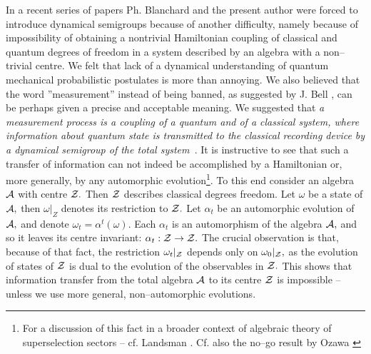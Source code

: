 \documentclass[12pt]{article}
\begin{document}
In a recent series of papers \cite{bla1,bla2,bla3,bla4} Ph. Blanchard and
the present author were forced to introduce dynamical semigroups because of
another difficulty,  namely because of  impossibility of obtaining 
a nontrivial Hamiltonian
coupling of classical and quantum degrees of freedom in a system described
by an algebra with a non--trivial centre.  We felt that lack of a
dynamical understanding of quantum mechanical probabilistic postulates is
more than annoying.  We also believed that the word ''measurement'' instead 
of being
banned,  as suggested by J.  Bell \cite{bel1,bel2},  can be perhaps given a precise
and acceptable meaning.  We suggested that {\em a measurement process is a 
coupling of a
quantum and of a classical system,  where information about quantum state is
transmitted to the classical recording device by a dynamical semigroup of
the total system\ }.  It is instructive to see that such a transfer of
information can not indeed be accomplished by a Hamiltonian or,  more generally, 
 by
any automorphic evolution\footnote{For a discussion of this fact in a broader 
context
of algebraic theory of superselection sectors -- cf. 
Landsman \cite[Sec. 4. 4]{lan}. Cf. also the no--go result by 
Ozawa \cite{oza}}.  To this end consider an algebra ${\cal A}$ with
centre ${\cal Z}. $ Then ${\cal Z}$ describes classical degrees freedom.  Let 
$\omega $ be a state of ${\cal A}, $ then ${\omega}|_Z$ denotes its
restriction to ${\cal Z}. $ Let $\alpha _t$ be an automorphic evolution of $
{\cal A}, $ and denote $\omega _t=\alpha ^t (\omega ). $ Each $\alpha _t$ is
an automorphism of the algebra ${\cal A} , $  and so it leaves its centre 
invariant:  
$\alpha _t: {\cal Z}\rightarrow {\cal Z}. $ The crucial observation is that,
because of that fact,  the restriction ${\omega _t}|_{{\cal Z}}$ depends only 
on ${
\omega _0}|_{{\cal Z}}, $ as the evolution of states of ${\cal Z}$ is dual to
the evolution of the observables in ${\cal Z}. $ This shows that information
transfer from the total algebra ${\cal A}$ to its centre ${\cal Z}$ is
impossible -- unless we use more general,  non--automorphic evolutions.
\end{document}
